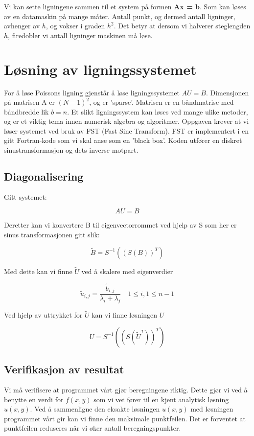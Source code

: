 \documentclass[11pt,norsk,a4paper]{article}
\begin{document}
Vi kan sette ligningene sammen til et system på formen \textbf{Ax = b}. Som kan løses av en datamaskin på mange måter. Antall punkt, og dermed antall ligninger, avhenger av $h$, og vokser i graden $h^2$. Det betyr at dersom vi halverer steglengden $h$, firedobler vi antall ligninger maskinen må løse. 

\section{Løsning av ligningssystemet}

For å løse Poissons ligning gjenstår å løse ligningssystemet $AU=B$. Dimensjonen på matrisen A er $(N-1)^2$, og er 'sparse'. Matrisen er en båndmatrise med båndbredde lik $b=n$. Et slikt ligningssystem kan løses ved mange ulike metoder, og er et viktig tema innen numerisk algebra og algoritmer. Oppgaven krever at vi løser systemet ved bruk av FST (Fast Sine Transform). FST er implementert i en gitt Fortran-kode som vi skal anse som en 'black box'. Koden utfører en diskret sinustransformasjon og dets inverse motpart.

\subsection{Diagonalisering}

Gitt systemet:

$$ AU=B $$

Deretter kan vi konvertere B til eigenvectorrommet ved hjelp av S som her er sinus transformasjonen gitt slik:

$$ \widetilde{B} = S^{-1}((S(B))^T) $$

Med dette kan vi finne $\widetilde{U}$ ved å skalere med eigenverdier

$$ \widetilde{u}_{i,j} = \frac{\widetilde{b}_{i,j}}{\lambda_{i}+\lambda_{j}} \quad 1 \leq i,1 \leq n-1 $$

Ved hjelp av uttrykket for $\widetilde{U}$ kan vi finne løsningen $U$

$$ U = S^{-1}((S(\widetilde{U}^T))^T) $$

\subsection{Verifikasjon av resultat}

Vi må verifisere at programmet vårt gjør beregningene riktig. Dette gjør vi ved å benytte en verdi for $f(x,y)$ som vi vet fører til en kjent analytisk løsning $u(x,y)$. Ved å sammenligne den eksakte løsningen $u(x,y)$ med løsningen programmet vårt gir kan vi finne den maksimale punktfeilen. Det er forventet at punktfeilen reduseres når vi øker antall beregningspunkter. 
\end{document}
